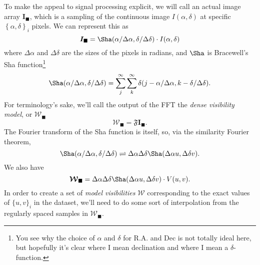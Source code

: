 \documentclass[modern]{aastex62}
\newcommand{\im}{\boldsymbol{I}_\blacksquare}
\newcommand{\vm}{\boldsymbol{\mathcal{W}}} %
\begin{document}
To make the appeal to signal processing explicit, we will call an actual image array $\im$, which is a sampling of the continuous image $I(\alpha, \delta)$ at specific $\left \{\alpha, \delta \right \}_i$ pixels. We can represent this as 
\begin{equation}
    \im = \Sha(\alpha/\Delta \alpha, \delta / \Delta \delta) \cdot I(\alpha, \delta)
\end{equation}
where $\Delta \alpha$ and $\Delta \delta$ are the sizes of the pixels in radians, and $\Sha$ is Bracewell's Sha function\footnote{You see why the choice of $\alpha$ and $\delta$ for R.A. and Dec is not totally ideal here, but hopefully it's clear where I mean declination and where I mean a $\delta$-function.}
\begin{equation}
    \Sha(\alpha/\Delta \alpha, \delta / \Delta \delta)  = \sum_j^\infty \sum_k^\infty \delta(j - \alpha/\Delta \alpha, k - \delta/\Delta \delta).
\end{equation}
For terminology's sake, we'll call the output of the FFT the \emph{dense visibility model}, or $\vm_\blacksquare$
\begin{equation}
    \vm_\blacksquare = \mathfrak{F} \im.
\end{equation}
The Fourier transform of the Sha function is itself, so, via the similarity Fourier theorem,
\begin{equation}
    \Sha(\alpha/\Delta \alpha, \delta / \Delta \delta) \rightleftharpoons \Delta \alpha \Delta \delta \Sha(\Delta \alpha u, \Delta \delta v).
\end{equation}
We also have 
\begin{equation}
    \vm_\blacksquare = \Delta \alpha \Delta \delta \Sha(\Delta \alpha u, \Delta \delta v) \cdot V(u, v).
\end{equation}
In order to create a set of \emph{model visibilities} $\vm$ corresponding to the exact values of $\{ u, v\}_i$ in the dataset, we'll need to do some sort of interpolation from the regularly spaced samples in $\vm_\blacksquare$. 
\end{document}
